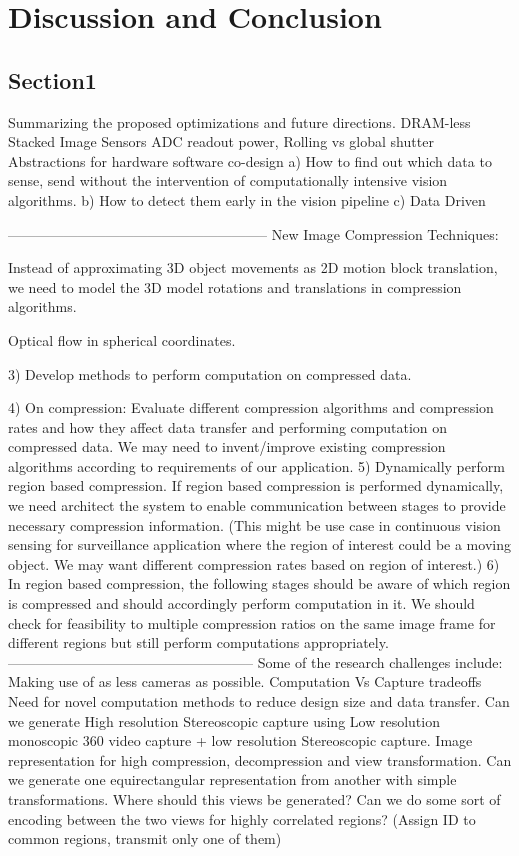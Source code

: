 \chapter{Discussion and Conclusion}
\section{Section1}
Summarizing the proposed optimizations and future directions.
DRAM-less
Stacked Image Sensors
ADC readout power, Rolling vs global shutter
Abstractions for hardware software co-design
a) How to find out which data to sense, send without the intervention of computationally intensive vision algorithms.
b) How to detect them early in the vision pipeline
c) Data Driven 

--------------------------------------------------------
    New Image Compression Techniques:​

Instead of approximating 3D object movements as 2D motion block translation, we need to model the 3D model rotations and translations in compression algorithms.

Optical flow in spherical coordinates.
	
3) 
Develop methods to perform computation on compressed data.


4)
On compression: 
Evaluate different compression algorithms and compression rates and how they affect data transfer and performing computation on compressed data. We may need to invent/improve existing compression algorithms according to requirements of our application.
5) 
Dynamically perform region based compression. If region based compression is performed dynamically, we need architect the system to enable communication between stages to provide necessary compression information. (This might be use case in continuous vision sensing for surveillance application where the region of interest could be a moving object. We may want different compression rates based on region of interest.) 
6)
In region based compression, the following stages should be aware of which region is compressed and should accordingly​ perform computation in it. We should check for feasibility  to multiple compression ratios on the same image frame for different regions but still perform computations appropriately. 
-----------------------------------------------------
Some of the research challenges include:
Making use of as less cameras as possible.
Computation Vs Capture tradeoffs
Need for novel computation methods to reduce design size and data transfer.
Can we generate High resolution Stereoscopic capture using Low resolution monoscopic 360 video capture + low resolution Stereoscopic capture.
Image representation for high compression, decompression and view transformation.
Can we generate one equirectangular representation from another with simple transformations. 
Where should this views be generated?
Can we do some sort of encoding between the two views for highly correlated regions? (Assign ID to common regions, transmit only one of them)

